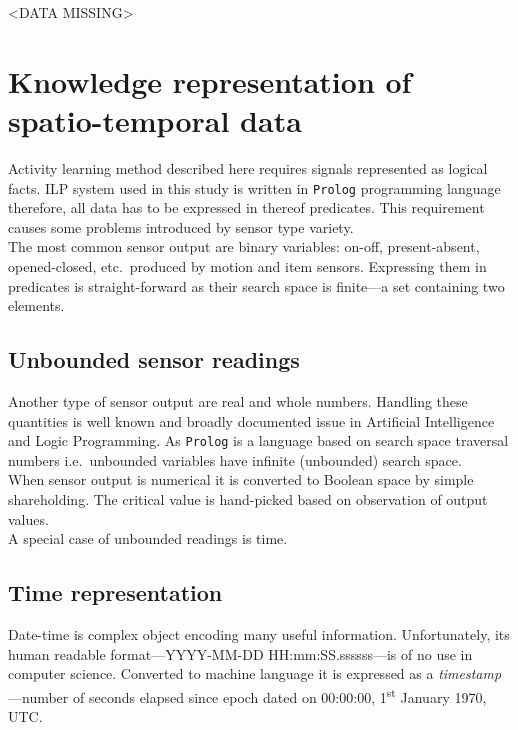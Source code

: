 \documentclass[10pt, a4paper, pdflatex, leqno, twoside, openright]{report}
\newcommand{\ts}{\textsuperscript}
\begin{document}
<DATA MISSING>

  \section{Knowledge representation of spatio-temporal data}
Activity learning method described here requires signals represented as logical facts. ILP system used in this study is written in \texttt{Prolog} programming language therefore, all data has to be expressed in thereof predicates. This requirement causes some problems introduced by sensor type variety.\\

The most common sensor output are binary variables: on-off, present-absent, opened-closed, etc.\ produced by motion and item sensors. Expressing them in predicates is straight-forward as their search space is finite---a set containing two elements.

    \subsection{Unbounded sensor readings}
Another type of sensor output are real and whole numbers. Handling these quantities is well known and broadly documented issue in Artificial Intelligence and Logic Programming. As \texttt{Prolog} is a language based on search space traversal numbers i.e.\ unbounded variables have infinite (unbounded) search space.\\

When sensor output is numerical it is converted to Boolean space by simple shareholding. The critical value is hand-picked based on observation of output values.\\
A special case of unbounded readings is time.

    \subsection{Time representation\label{sec:timeRepresentation}}
Date-time is complex object encoding many useful information. Unfortunately, its human readable format---YYYY-MM-DD HH:mm:SS.ssssss---is of no use in computer science. Converted to machine language it is expressed as a \emph{timestamp}---number of seconds elapsed since epoch dated on 00:00:00, 1\ts{st} January 1970, UTC.\\
\end{document}

